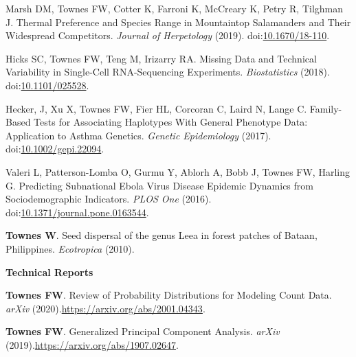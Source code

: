 \documentclass[10pt]{article}
\newcommand\doilink[1]{\href{https://dx.doi.org/#1}{#1}}
\newcommand\doi[1]{doi:\doilink{#1}}
\newcommand\arxiv[1]{\url{https://arxiv.org/abs/#1}}
\begin{document}
\begin{enumerate}[label= {[\arabic*]}]
\item Marsh DM, Townes FW, Cotter K, Farroni K, McCreary K, Petry R, Tilghman J. Thermal Preference and Species Range in Mountaintop Salamanders and Their Widespread Competitors. {\it Journal of Herpetology} (2019). \doi{10.1670/18-110}.
\item Hicks SC, Townes FW, Teng M, Irizarry RA. Missing Data and Technical Variability in Single-Cell RNA-Sequencing Experiments. {\it Biostatistics} (2018). \doi{10.1101/025528}.
\item Hecker, J, Xu X, Townes FW, Fier HL, Corcoran C, Laird N, Lange C. Family-Based Tests for Associating Haplotypes With General Phenotype Data: Application to Asthma Genetics. {\it Genetic Epidemiology} (2017). \doi{10.1002/gepi.22094}.
\item Valeri L, Patterson-Lomba O, Gurmu Y, Ablorh A, Bobb J, Townes FW, Harling G. Predicting Subnational Ebola Virus Disease Epidemic Dynamics from Sociodemographic Indicators. {\it PLOS One} (2016). \doi{10.1371/journal.pone.0163544}.
\item {\bf Townes W}. Seed dispersal of the genus Leea in forest patches of Bataan, Philippines. {\it Ecotropica } (2010).
\end{enumerate}

\textbf{Technical Reports}
\begin{enumerate}[label= {[\arabic*]}]
\item {\bf Townes FW}. Review of Probability Distributions for Modeling Count Data. {\it arXiv} (2020).\newline \arxiv{2001.04343}.
\item {\bf Townes FW}. Generalized Principal Component Analysis. {\it arXiv} (2019).\newline \arxiv{1907.02647}.
\end{enumerate}

\end{document}
